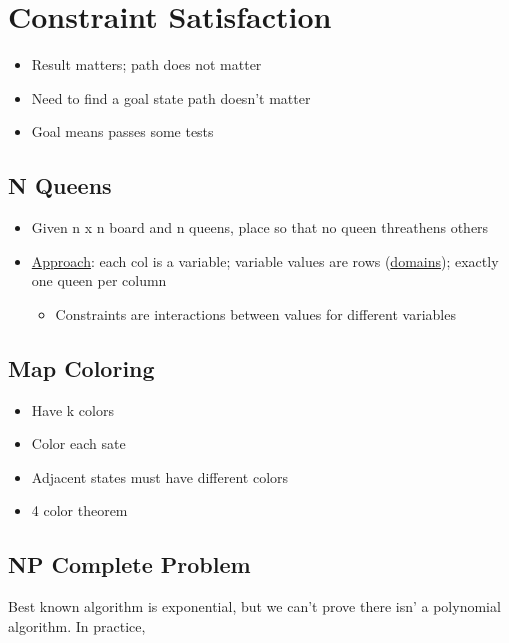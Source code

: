 \section{Constraint Satisfaction}

  \begin{itemize}
    \item Result matters; path does not matter
    \item Need to find a goal state path doesn't matter
    \item Goal means passes some tests
  \end{itemize}

  \subsection{N Queens}

    \begin{itemize}
      \item Given n x n board and n queens, place so that no queen threathens others
      \item \ul{Approach}: each col is a variable; variable values are
      rows (\ul{domains}); exactly one queen per column
      \begin{itemize}
        \item Constraints are interactions between values for different variables
      \end{itemize}
    \end{itemize}

  \subsection{Map Coloring}

    \begin{itemize}
      \item Have k colors
      \item Color each sate
      \item Adjacent states must have different colors
      \item 4 color theorem
    \end{itemize}

  \subsection{NP Complete Problem}

    Best known algorithm is exponential, but we can't prove there isn'
    a polynomial algorithm. In practice,